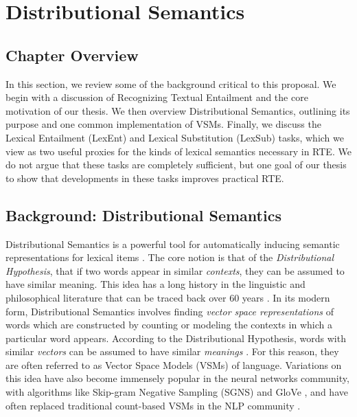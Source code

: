 \chapter{Distributional Semantics}
\label{sec:background}

\section{Chapter Overview}

In this section, we review some of the background critical to this proposal.
We begin with a discussion of Recognizing Textual Entailment and the core
motivation of our thesis.  We then overview Distributional Semantics, outlining
its purpose and one common implementation of VSMs. Finally, we discuss the
Lexical Entailment (LexEnt) and Lexical Substitution (LexSub) tasks, which we
view as two useful proxies for the kinds of lexical semantics necessary in
RTE. We do not argue that these tasks are completely sufficient, but one goal
of our thesis to show that developments in these tasks improves practical RTE.

\section{Background: Distributional Semantics}
\label{sec:dist}

Distributional Semantics is a powerful tool for automatically inducing semantic
representations for lexical items \cite{turney:2010:jair,erk:2012:llc}.  The
core notion is that of the {\em Distributional Hypothesis}, that if two words
appear in similar {\em contexts}, they can be assumed to have similar meaning.
This idea has a long history in the linguistic and philosophical literature that
can be traced back over 60 years
\cite{wittgenstein:1953:pi,harris:1954:word,firth:1957:la}. In its modern form,
Distributional Semantics involves finding {\em vector space representations} of
words which are constructed by counting or modeling the contexts in which a
particular word appears. According to the Distributional Hypothesis, words
with similar {\em vectors} can be assumed to have similar {\em meanings}
\cite{turney:2010:jair}. For this reason, they are often referred to as
Vector Space Models (VSMs) of language. Variations on this idea have also
become immensely popular in the neural networks community, with algorithms
like Skip-gram Negative Sampling (SGNS) \cite{mikolov:2013:iclr} and GloVe
\cite{pennington:2014:emnlp}, and have often replaced traditional count-based
VSMs in the NLP community \cite{baroni:2014:acl}.

